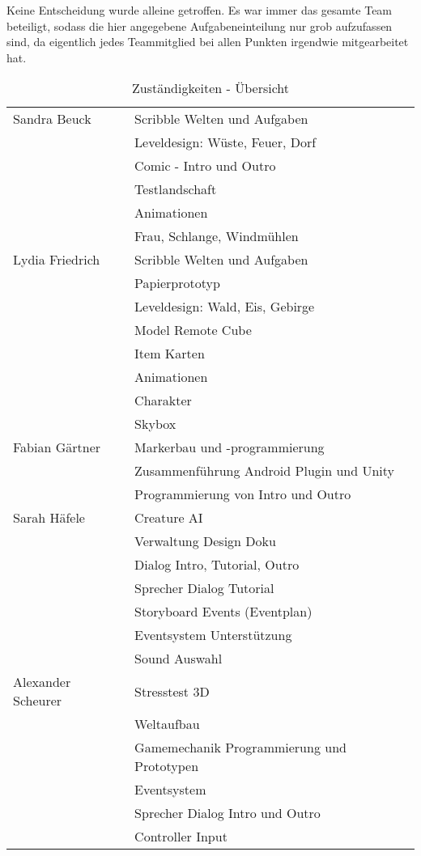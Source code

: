 
Keine Entscheidung wurde alleine getroffen. Es war immer das gesamte Team beteiligt, sodass die hier angegebene Aufgabeneinteilung nur grob aufzufassen sind, da eigentlich jedes Teammitglied bei allen Punkten irgendwie mitgearbeitet hat.

\begin{table}[!htbp] %
\begin{center}
\begin{tabular}[hc]{l|l}
\hline
Sandra Beuck & Scribble Welten und Aufgaben\\
& Leveldesign: Wüste, Feuer, Dorf\\
& Comic - Intro und Outro\\
& Testlandschaft\\
& Animationen\\
& Frau, Schlange, Windmühlen\\
\hline
Lydia Friedrich & Scribble Welten und Aufgaben\\
& Papierprototyp\\
& Leveldesign: Wald, Eis, Gebirge\\
& Model Remote Cube\\
& Item Karten\\
& Animationen\\
& Charakter\\
& Skybox\\
\hline
Fabian Gärtner & Markerbau und -programmierung\\
& Zusammenführung Android Plugin und Unity\\
& Programmierung von Intro und Outro\\
\hline
Sarah Häfele & Creature AI\\
& Verwaltung Design Doku\\
& Dialog Intro, Tutorial, Outro\\
& Sprecher Dialog Tutorial\\
& Storyboard Events (Eventplan)\\
& Eventsystem Unterstützung\\
& Sound Auswahl\\
\hline
Alexander Scheurer & Stresstest 3D\\
& Weltaufbau\\
& Gamemechanik Programmierung und Prototypen\\
& Eventsystem\\
& Sprecher Dialog Intro und Outro\\
& Controller Input\\
\end{tabular}
\caption{Zuständigkeiten - Übersicht}
\label{tab:aufgaben}
\end{center}
\end{table}